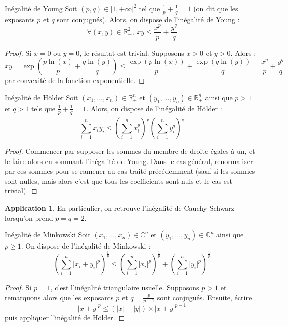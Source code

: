\documentclass[french]{article}
\newcommand{\R}{\mathbb{R}}
\newcommand{\C}{\mathbb{C}}
\theoremstyle{theorem}
\theoremstyle{definition}
\newtheorem*{app}{Application}
\begin{document}
\begin{lem}{Inégalité de Young}
	Soit $(p,q)\in]1,+\infty[^2$ tel que $\displaystyle\frac{1}{p}+\frac{1}{q}=1$ (on dit que les exposants $p$ et $q$ sont conjugués). Alors, on dispose de l'inégalité de Young : $$\forall (x,y)\in\R_+^2,\ xy\leqslant\frac{x^p}{p}+\frac{y^q}{q}$$
\end{lem}
\begin{proof}
	Si $x=0$ ou $y=0$, le résultat est trivial. Supposons $x>0$ et $y>0$. Alors : $$xy=\exp\left(\frac{p\ln(x)}{p}+\frac{q\ln(y)}{q}\right)\leqslant\frac{\exp(p\ln(x))}{p}+\frac{\exp(q\ln(y))}{q}=\frac{x^p}{p}+\frac{y^q}{q}$$ par convexité de la fonction exponentielle.
\end{proof}
\begin{lem}{Inégalité de Hölder}
	Soit $(x_1,\ldots,x_n)\in\R_+^n$ et $(y_1,\ldots,y_n)\in\R_+^n$ ainsi que $p>1$ et $q>1$ tels que $\displaystyle\frac{1}{p}+\frac{1}{q}=1$. Alors, on dispose de l'inégalité de Hölder : $$\sum_{i=1}^{n}x_iy_i\leqslant\left(\sum_{i=1}^{n}x_i^p\right)^{\frac{1}{p}}\left(\sum_{i=1}^{n}y_i^q\right)^{\frac{1}{q}}$$
\end{lem}
\begin{proof}
	Commencer par supposer les sommes du membre de droite égales à un, et le faire alors en sommant l'inégalité de Young. Dans le cas général, renormaliser par ces sommes pour se ramener au cas traité précédemment (sauf si les sommes sont nulles, mais alors c'est que tous les coefficients sont nuls et le cas est trivial).
\end{proof}
\begin{app}
	En particulier, on retrouve l'inégalité de Cauchy-Schwarz lorsqu'on prend $p=q=2$.
\end{app}
\begin{lem}{Inégalité de Minkowski}
	Soit $(x_1,\ldots,x_n)\in\C^n$ et $(y_1,\ldots,y_n)\in\C^n$ ainsi que $p\geqslant 1$. On dispose de l'inégalité de Minkowski : $$\left(\sum_{i=1}^{n}\lvert x_i+y_i\rvert^p\right)^{\frac{1}{p}}\leqslant\left(\sum_{i=1}^{n}\lvert x_i\rvert^p\right)^{\frac{1}{p}}+\left(\sum_{i=1}^{n}\lvert y_i\rvert^p\right)^{\frac{1}{p}}$$
\end{lem}
\begin{proof}
	Si $p=1$, c'est l'inégalité triangulaire usuelle. Supposons $p>1$ et remarquons alors que les exposants $p$ et $q=\displaystyle\frac{p}{p-1}$ sont conjugués. Ensuite, écrire $$\lvert x+y\rvert^p\leqslant(\lvert x\rvert+\lvert y\rvert)\times\lvert x+y\rvert^{p-1}$$ puis appliquer l'inégalité de Hölder.
\end{proof}
\end{document}
